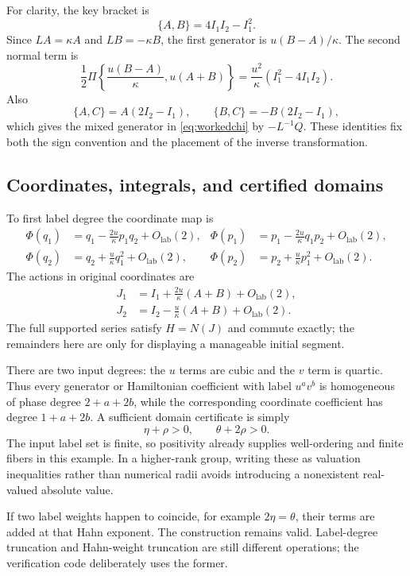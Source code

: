 \documentclass[11pt,letterpaper]{article}
\numberwithin{equation}{section}
\theoremstyle{definition}
\theoremstyle{remark}
\newcommand{\lab}{\mathrm{lab}}
\begin{document}
For clarity, the key bracket is
\[
 \{A,B\}=4I_1I_2-I_1^2.
\]
Since $LA=\kappa A$ and $LB=-\kappa B$, the first generator is
$u(B-A)/\kappa$. The second normal term is
\[
 \frac12\Pi\left\{\frac{u(B-A)}{\kappa},u(A+B)\right\}
 =\frac{u^2}{\kappa}(I_1^2-4I_1I_2).
\]
Also
\[
 \{A,C\}=A(2I_2-I_1),\qquad
 \{B,C\}=-B(2I_2-I_1),
\]
which gives the mixed generator in \eqref{eq:workedchi} by
$-L^{-1}Q$. These identities fix both the sign convention and the placement
of the inverse transformation.

\subsection{Coordinates, integrals, and certified domains}
To first label degree the coordinate map is
\begin{align*}
 \Phi(q_1)&=q_1-\frac{2u}{\kappa}p_1q_2+O_\lab(2),&
 \Phi(p_1)&=p_1-\frac{2u}{\kappa}q_1p_2+O_\lab(2),\\
 \Phi(q_2)&=q_2+\frac{u}{\kappa}q_1^2+O_\lab(2),&
 \Phi(p_2)&=p_2+\frac{u}{\kappa}p_1^2+O_\lab(2).
\end{align*}
The actions in original coordinates are
\begin{align*}
 J_1&=I_1+\frac{2u}{\kappa}(A+B)+O_\lab(2),\\
 J_2&=I_2-\frac{u}{\kappa}(A+B)+O_\lab(2).
\end{align*}
The full supported series satisfy $H=N(J)$ and commute exactly; the
remainders here are only for displaying a manageable initial segment.

There are two input degrees: the $u$ terms are cubic and the $v$ term is
quartic. Thus every generator or Hamiltonian coefficient with label $u^av^b$
is homogeneous of phase degree $2+a+2b$, while the corresponding coordinate
coefficient has degree $1+a+2b$. A sufficient domain certificate is simply
\begin{equation}\label{eq:exampledomain}
 \eta+\rho>0,\qquad \theta+2\rho>0.
\end{equation}
The input label set is finite, so positivity already supplies well-ordering
and finite fibers in this example. In a higher-rank group, writing these
as valuation inequalities rather than numerical radii avoids introducing a
nonexistent real-valued absolute value.

If two label weights happen to coincide, for example $2\eta=\theta$, their
terms are added at that Hahn exponent. The construction remains valid.
Label-degree truncation and Hahn-weight truncation are still different
operations; the verification code deliberately uses the former.
\end{document}
